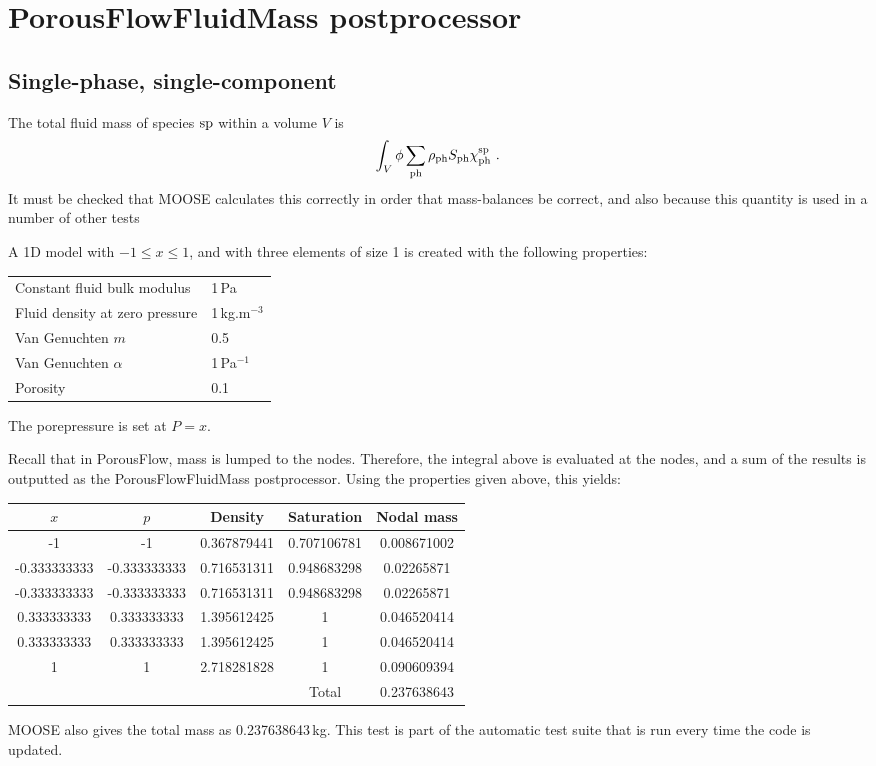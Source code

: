 \chapter{PorousFlowFluidMass postprocessor}

\section{Single-phase, single-component}
\label{1phase1comp.sec}

The total fluid mass of species $\mathrm{sp}$ within a volume $V$ is
\begin{equation}
\int_{V} \phi\sum_{\mathrm{ph}}\rho_{\mathrm{ph}} S_{\mathrm{ph}}\chi_{\mathrm{ph}}^{\mathrm{sp}} \ .
\label{eq:mass}
\end{equation}
It must be checked that MOOSE calculates this correctly in order that
mass-balances be correct, and also because this quantity is used in a
number of other tests

A 1D model with $-1\leq x \leq 1$, and with three elements of size 1 is
created with the following properties:
\begin{center}
\begin{tabular}{|ll|}
\hline
Constant fluid bulk modulus & 1\,Pa \\
Fluid density at zero pressure & 1\,kg.m$^{-3}$ \\
Van Genuchten $m$ & 0.5 \\
Van Genuchten $\alpha$ & 1\,Pa$^{-1}$ \\
Porosity & 0.1 \\
\hline
\end{tabular}
\end{center}
The porepressure is set at $P=x$.

Recall that in PorousFlow, mass is lumped to the nodes.  Therefore,
the integral above is evaluated at the nodes, and a sum of the results
is outputted as the PorousFlowFluidMass postprocessor.
Using the properties given above, this yields:
\begin{center}
\begin{tabular}{|ccccc|}
\hline
$x$ & $p$ & Density & Saturation & Nodal mass \\
\hline
-1 & -1 & 0.367879441 & 0.707106781 & 0.008671002 \\
-0.333333333 & -0.333333333 & 0.716531311 & 0.948683298 & 0.02265871 \\
-0.333333333 & -0.333333333 & 0.716531311 & 0.948683298 & 0.02265871 \\
0.333333333 & 0.333333333 & 1.395612425 & 1 & 0.046520414 \\
0.333333333 & 0.333333333 & 1.395612425 & 1 & 0.046520414 \\
1& 1 & 2.718281828 & 1 & 0.090609394 \\
\hline
 & & & Total & 0.237638643 \\
\hline
\end{tabular}
\end{center}
MOOSE also gives the total mass as 0.237638643\,kg.  This test is part of
the automatic test suite that is run every time the code is updated.

